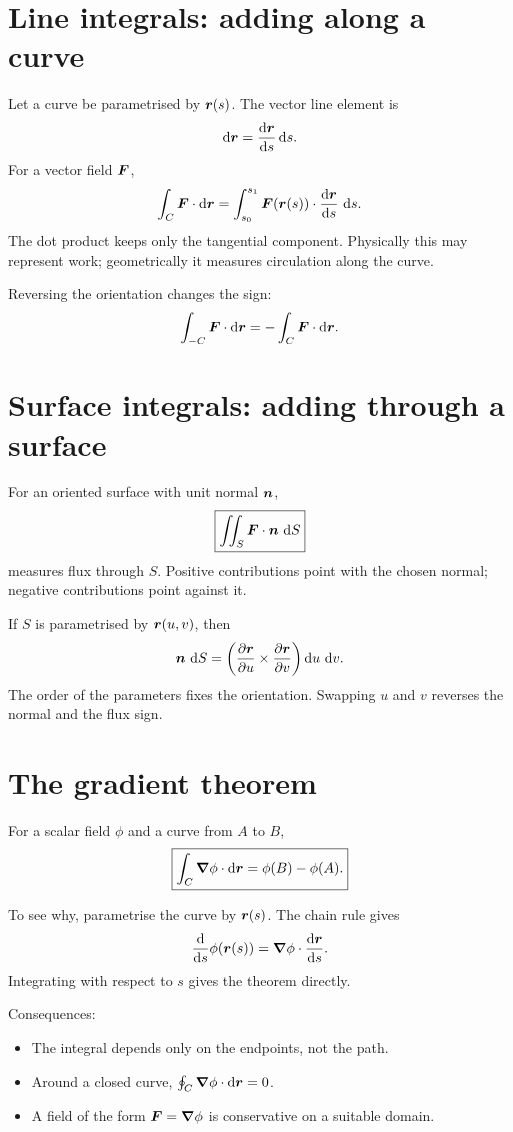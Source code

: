 \documentclass[11pt,a4paper]{article}
\begin{document}
\section{Line integrals: adding along a curve}

Let a curve be parametrised by $\bm{r}(s)$. The vector line element is
\[
\mathop{}\!\mathrm d\bm{r}=\frac{\mathop{}\!\mathrm d \bm{r}}{\mathop{}\!\mathrm d s}\mathop{}\!\mathrm d s.
\]
For a vector field $\bm{F}$,
\[
\int_C\bm{F}\cdot\mathop{}\!\mathrm d\bm{r}
=\int_{s_0}^{s_1}\bm{F}(\bm{r}(s))\cdot\frac{\mathop{}\!\mathrm d \bm{r}}{\mathop{}\!\mathrm d s}\,\mathop{}\!\mathrm d s.
\]
The dot product keeps only the tangential component. Physically this may represent work; geometrically it measures circulation along the curve.

Reversing the orientation changes the sign:
\[
\int_{-C}\bm{F}\cdot\mathop{}\!\mathrm d\bm{r}=-\int_C\bm{F}\cdot\mathop{}\!\mathrm d\bm{r}.
\]

\section{Surface integrals: adding through a surface}

For an oriented surface with unit normal $\bm{n}$,
\[
\boxed{\iint_S\bm{F}\cdot\bm{n}\,\mathop{}\!\mathrm d S}
\]
measures flux through $S$. Positive contributions point with the chosen normal; negative contributions point against it.

If $S$ is parametrised by $\bm{r}(u,v)$, then
\[
\bm{n}\,\mathop{}\!\mathrm d S
=\left(\frac{\partial \bm{r}}{\partial u}\times\frac{\partial \bm{r}}{\partial v}\right)\mathop{}\!\mathrm d u\,\mathop{}\!\mathrm d v.
\]
The order of the parameters fixes the orientation. Swapping $u$ and $v$ reverses the normal and the flux sign.

\section{The gradient theorem}

For a scalar field $\phi$ and a curve from $A$ to $B$,
\[
\boxed{\int_C\boldsymbol\nabla\phi\cdot\mathop{}\!\mathrm d\bm{r}=\phi(B)-\phi(A).}
\]

To see why, parametrise the curve by $\bm{r}(s)$. The chain rule gives
\[
\frac{\mathop{}\!\mathrm d }{\mathop{}\!\mathrm d s}\phi(\bm{r}(s))
=\boldsymbol\nabla\phi\cdot\frac{\mathop{}\!\mathrm d \bm{r}}{\mathop{}\!\mathrm d s}.
\]
Integrating with respect to $s$ gives the theorem directly.

Consequences:

\begin{itemize}
\item The integral depends only on the endpoints, not the path.
\item Around a closed curve, $\oint_C\boldsymbol\nabla\phi\cdot\mathop{}\!\mathrm d\bm{r}=0$.
\item A field of the form $\bm{F}=\boldsymbol\nabla\phi$ is conservative on a suitable domain.
\end{itemize}
\end{document}
